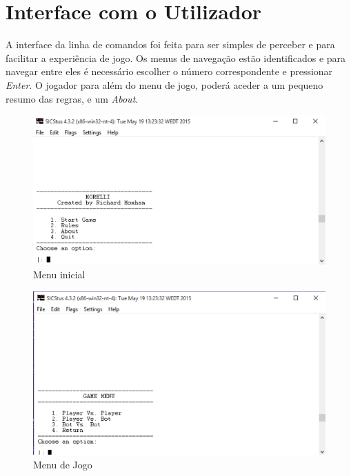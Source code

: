 \documentclass[a4paper]{article}
\begin{document}
\newpage
\section{Interface com o Utilizador}

A interface da linha de comandos foi feita para ser simples de perceber e para facilitar a experiência de jogo. Os menus de navegação estão identificados e para navegar entre eles é necessário escolher o número correspondente e pressionar \textit{Enter}. O jogador para além do menu de jogo, poderá aceder a um pequeno resumo das regras, e um \textit{About}.

\begin{figure}[h!]
\begin{center}
\hspace*{-0.5cm}\includegraphics[scale=0.9]{menu1.png}
\caption{Menu inicial}
\end{center}
\end{figure}

\begin{figure}[h!]
\begin{center}
\hspace*{-0.5cm}\includegraphics[scale=0.9]{menu2.png}
\caption{Menu de Jogo}
\end{center}
\end{figure}
\end{document}
